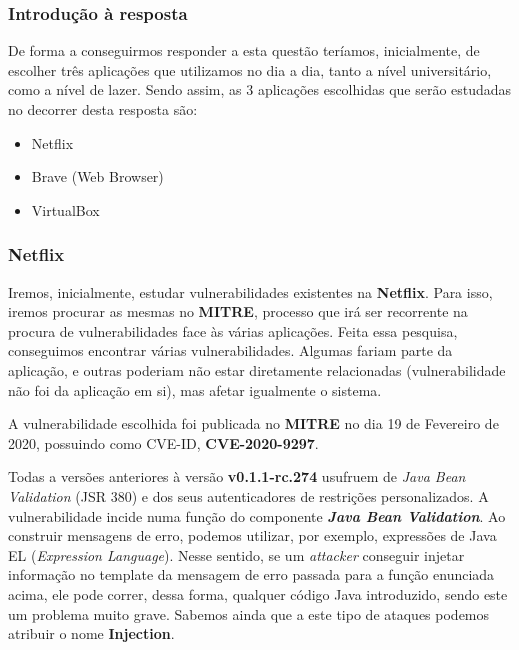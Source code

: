 \documentclass[11t]{article}
\begin{document}
\vspace{0.5cm}

\subsubsection{Introdução à resposta}
De forma a conseguirmos responder a esta questão teríamos, inicialmente, de escolher três aplicações que utilizamos no dia a dia, tanto a nível universitário, como a nível de lazer. Sendo assim, as 3 aplicações escolhidas que serão estudadas no decorrer desta resposta são:

\begin{itemize}
    \item Netflix
    \item Brave (Web Browser)
    \item VirtualBox
\end{itemize}

\vspace{0.25cm}

\subsubsection{Netflix}

Iremos, inicialmente, estudar vulnerabilidades existentes na \textbf{Netflix}. Para isso, iremos procurar as mesmas no \textbf{MITRE}, processo que irá ser recorrente na procura de vulnerabilidades face às várias aplicações. Feita essa pesquisa, conseguimos encontrar várias vulnerabilidades. Algumas fariam parte da aplicação, e outras poderiam não estar diretamente relacionadas (vulnerabilidade não foi da aplicação em si), mas afetar igualmente o sistema.

\vspace{0.1cm}

A vulnerabilidade escolhida foi publicada no \textbf{MITRE} no dia 19 de Fevereiro de 2020, possuindo como CVE-ID, \textbf{CVE-2020-9297}. 

\vspace{0.1cm}

Todas a versões anteriores à versão \textbf{v0.1.1-rc.274} usufruem de \textit{Java Bean Validation} (JSR 380) e dos seus autenticadores de restrições personalizados. A vulnerabilidade incide numa função do componente \textit{\textbf{Java Bean Validation}}. Ao construir mensagens de erro, podemos utilizar, por exemplo, expressões de Java EL (\textit{Expression Language}). Nesse sentido, se um \textit{attacker} conseguir injetar informação no template da mensagem de erro passada para a função enunciada acima, ele pode correr, dessa forma, qualquer código Java introduzido, sendo este um problema muito grave. Sabemos ainda que a este tipo de ataques podemos atribuir o nome \textbf{Injection}.
\end{document}
